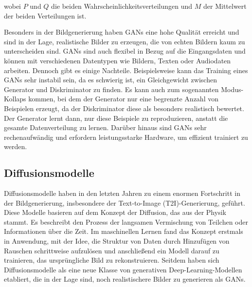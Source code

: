 wobei $P$ und $Q$ die beiden Wahrscheinlichkeitsverteilungen und $M$ der Mittelwert der beiden Verteilungen ist.

Besonders in der Bildgenerierung haben GANs eine hohe Qualität erreicht und sind in der Lage, realistische Bilder zu erzeugen, die von echten Bildern kaum zu unterscheiden sind. GANs sind auch flexibel in Bezug auf die Eingangsdaten und können mit verschiedenen Datentypen wie Bildern, Texten oder Audiodaten arbeiten. Dennoch gibt es einige Nachteile. Beispielsweise kann das Training eines GANs sehr instabil sein, da es schwierig ist, ein Gleichgewicht zwischen Generator und Diskriminator zu finden. Es kann auch zum sogenannten Modus-Kollaps kommen, bei dem der Generator nur eine begrenzte Anzahl von Beispielen erzeugt, da der Diskriminator diese als besonders realistisch bewertet. Der Generator lernt dann, nur diese Beispiele zu reproduzieren, anstatt die gesamte Datenverteilung zu lernen. Darüber hinaus sind GANs sehr rechenaufwändig und erfordern leistungsstarke Hardware, um effizient trainiert zu werden.

\subsection{Diffusionsmodelle} \label{sec:diffusion-models}

Diffusionsmodelle haben in den letzten Jahren zu einem enormen Fortschritt in der Bildgenerierung, insbesondere der Text-to-Image (T2I)-Generierung, geführt. Diese Modelle basieren auf dem Konzept der Diffusion, das aus der Physik stammt. Es beschreibt den Prozess der langsamen Vermischung von Teilchen oder Informationen über die Zeit. Im maschinellen Lernen fand das Konzept erstmals in \parencite{SohlDickstein2015diffusionmodels} Anwendung, mit der Idee, die Struktur von Daten durch Hinzufügen von Rauschen schrittweise aufzulösen und anschließend ein Modell darauf zu trainieren, das ursprüngliche Bild zu rekonstruieren. Seitdem haben sich Diffusionsmodelle als eine neue Klasse von generativen Deep-Learning-Modellen etabliert, die in der Lage sind, noch realistischere Bilder zu generieren als GANs.

